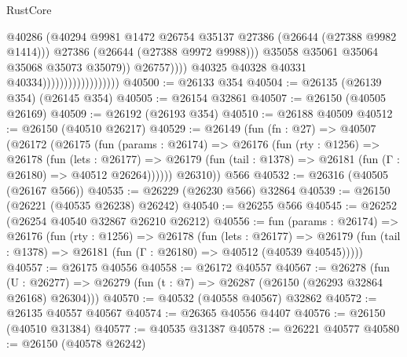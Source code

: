 \begin{lexlean}{RustCore}
\begin{coremodule}
                                                      @40286
                                                      (@40294
                                                        @9981
                                                        @1472
                                                        @26754
                                                        @35137
                                                        @27386
                                                        (@26644 (@27388 @9982 @1414)))
                                                      @27386
                                                      (@26644 (@27388 @9972 @9988)))
                                                    @35058
                                                    @35061
                                                    @35064
                                                    @35068
                                                    @35073
                                                    @35079))
                                                @26757))))
                                        @40325
                                        @40328
                                        @40331
                                        @40334))))))))))))))))))
@40500 := @26133 @354
@40504 := @26135 (@26139 @354) (@26145 @354)
@40505 := @26154 @32861
@40507 := @26150 (@40505 @26169)
@40509 := @26192 (@26193 @354)
@40510 := @26188 @40509
@40512 := @26150 (@40510 @26217)
@40529 := @26149
    (fun (fn : @27) =>
    @40507
      (@26172
        (@26175
          (fun (params : @26174) =>
          @26176
            (fun (rty : @1256) =>
            @26178
              (fun (lets : @26177) =>
              @26179 (fun (tail : @1378) => @26181 (fun (Γ : @26180) => @40512 @26264))))))
        @26310))
    @566
@40532 := @26316 (@40505 (@26167 @566))
@40535 := @26229 (@26230 @566) @32864
@40539 := @26150 (@26221 (@40535 @26238) @26242)
@40540 := @26255 @566
@40545 := @26252 (@26254 @40540 @32867 @26210 @26212)
@40556 := fun (params : @26174) =>
  @26176
    (fun (rty : @1256) =>
    @26178
      (fun (lets : @26177) =>
      @26179 (fun (tail : @1378) => @26181 (fun (Γ : @26180) => @40512 (@40539 @40545)))))
@40557 := @26175 @40556
@40558 := @26172 @40557
@40567 := @26278
    (fun (U : @26277) => @26279 (fun (t : @7) => @26287 (@26150 (@26293 @32864 @26168) @26304)))
@40570 := @40532 (@40558 @40567) @32862
@40572 := @26135 @40557 @40567
@40574 := @26365 @40556 @4407
@40576 := @26150 (@40510 @31384)
@40577 := @40535 @31387
@40578 := @26221 @40577
@40580 := @26150 (@40578 @26242)

\end{coremodule}
\end{lexlean}

